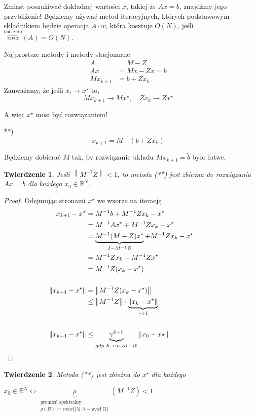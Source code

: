 \documentclass[hidelinks,a4paper,fleqn]{article}
\newcommand{\RR}{\mathbb{R}}
\newcommand{\ra}{\rightarrow}
\newcommand{\eye}{I}
\newcommand{\norm}[1]{\left\lVert#1\right\rVert}
\newtheorem{twierdz}{Twierdzenie}
\begin{document}
Zmiast poszukiwać dokładnej wartości $x$, takiej że $Ax=b$, znajdźmy jego przybliżenie! Będziemy używać metod iteracyjnych, których podstawowym składnikiem będzie operacja $A \cdot w$, która kosztuje $O(N)$, jeśli $\overbrace{nnz}^{\textrm{non zero}}(A) = O(N)$.


Najprostsze metody i metody stacjonarne:
\begin{align*}
	A & = M - Z \\
	Ax & = Mx - Zx = b\\
	Mx_{k+1} & = b + Zx_k 
\end{align*}
Zauważamy, że jeśli $x_i \ra x^\star$ to,
\[
	Mx_{k+1} \ra Mx^\star,\quad Zx_k \ra Zx^\star
\]

A więc $x^\star$ musi być rozwiązaniem!

**)
\[
	x_{k+1} = M^{-1}(b + Zx_k)
\]

Będziemy dobierać $M$ tak, by rozwiązanie układu $Mx_{k+1} = \tilde{b}$ było łatwe.

\begin{twierdz}
	Jeśli $\norm{M^{-1}Z} < 1$, to metoda (**) jest zbieżna do rozwiązania $Ax = b$ dla każdego $x_0 \in \RR^N$.
\end{twierdz}


\begin{proof}
  Odejmując stronami $x^\star$ we wzorze na iterację
  \begin{align*}
	x_{k+1} - x^\star & = M^{-1}b + M^{-1}Zx_k - x^\star \\
		& = M^{-1}Ax^\star + M^{-1}Zx_k - x^\star \\
		& = \underbrace{M^{-1}(M-Z)x^\star}_{\eye - M^{-1}Z} + M^{-1}Zx_k - x^\star \\
		& = M^{-1}Zx_k - M^{-1}Zx^\star\\
		& = M^{-1}Z(x_k - x^\star) \\ \\
		\norm{x_{k+1} - x^\star} & = \norm{M^{-1}Z(x_k - x^\star)} \\
		& \leq \norm{M^{-1}Z} \cdot \underbrace{\norm{x_k - x^\star}}_{\gamma < 1} \\ \\
		\norm{x_{k+1} - x^\star} & \leq \underbrace{\gamma^{k+1}}_{gdy\ k \ra \infty, to\ \ra 0} \norm{x_0 - x\star}
		 && \qedhere
  \end{align*}
\end{proof}
	
\begin{twierdz}
	Metoda (**) jest zbieżna do $x^\star$ dla każdego

    $x_0 \in \RR^N \iff \underbrace{\rho}_{\substack{\textrm{promień spektralny: }\\ \rho(B) := max\{| \lambda|: \lambda - \textrm{w.wł B}\}}}(M^{-1}Z) < 1$
\end{twierdz}
\end{document}
